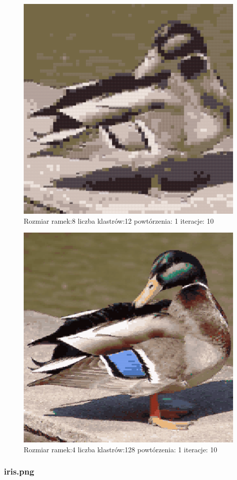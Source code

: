 \documentclass{classrep}
\begin{document}
{{{{\begin{figure}[!htbp]
\centering
\includegraphics[width=\textwidth,width=90mm]{obrazy/duck_R8_K12_P1_It10.png}
\caption{Rozmiar ramek:8 liczba klastrów:12 powtórzenia: 1 iteracje: 10 }
\end{figure}

\begin{figure}[!htbp]
\centering
\includegraphics[width=\textwidth,width=90mm]{obrazy/duck_R4_K128_P1_It10.png}
\caption{Rozmiar ramek:4 liczba klastrów:128 powtórzenia: 1 iteracje: 10 }
\end{figure}
\FloatBarrier
}

\subsubsection{iris.png}
{

}}}}
\end{document}
